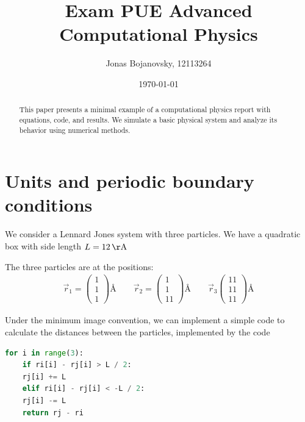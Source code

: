 \documentclass[11pt]{article}
\title{Exam PUE Advanced Computational Physics}
\author{Jonas Bojanovsky, 12113264}
\date{\today}
\begin{document}
\maketitle

\begin{abstract}
This paper presents a minimal example of a computational physics report with equations, code, and results. We simulate a basic physical system and analyze its behavior using numerical methods.
\end{abstract}

\section{Units and periodic boundary conditions}

We consider a Lennard Jones system with three particles. We have a quadratic box with side length $ L = \SI{12}{\AA} $

The three particles are at the positions:
\begin{align}
	\vec r_1 = \begin{pmatrix}
		1\\1\\1
	\end{pmatrix}\si{\angstrom}
\qquad
\vec r_2 = 
\begin{pmatrix}
	1\\1\\11
\end{pmatrix}
\si{\angstrom}
\qquad
\vec r_3
\begin{pmatrix}
	11\\11\\11
\end{pmatrix}\si{\angstrom}
\end{align}

Under the minimum image convention, we can implement a simple code to calculate the distances between the particles, implemented by the code
\begin{lstlisting}[language = Python, caption={Implementing Minimum image convention}]
 for i in range(3):
	if ri[i] - rj[i] > L / 2:
	rj[i] += L
	elif ri[i] - rj[i] < -L / 2:
	rj[i] -= L
	return rj - ri
\end{lstlisting}
\end{document}
